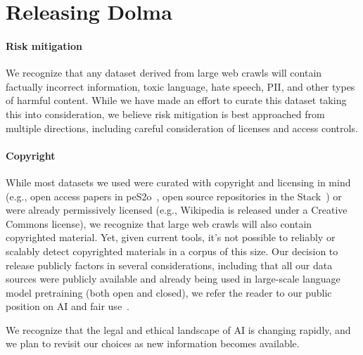 
\section{Releasing Dolma}
\label{sec:release}



\paragraph{Risk mitigation} We recognize that any dataset derived from large web crawls will contain factually incorrect information, toxic language, hate speech, PII, and other types of harmful content. 
While we have made an effort to curate this dataset taking this into consideration, we believe risk mitigation is best approached from multiple directions,
including careful consideration of licenses and access controls.






\paragraph{Copyright} While most datasets we used were curated with copyright and licensing in mind (e.g., open access papers in peS2o~\citep{peS2o}, open source repositories in the Stack~\citep{kocetkov2022stack}) or were already permissively licensed (e.g., Wikipedia is released under a Creative Commons license), we recognize that large web crawls will also contain copyrighted material. 
Yet, given current tools, it's not possible to reliably or scalably detect copyrighted materials in a corpus of this size.
Our decision to release \dolma publicly factors in several considerations, including that all our data sources were publicly available and already being used in large-scale language model pretraining (both open and closed), we refer the reader to our public position on AI and fair use~\citep{uspto-copyright-ai2}.

We recognize that the legal and ethical landscape of AI is changing rapidly, and we plan to revisit our choices as new information becomes available.
